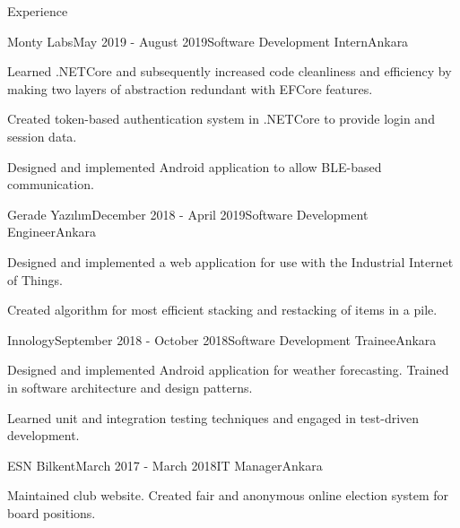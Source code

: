 \documentclass{resume} %
\begin{document}
\begin{rSection}{Experience}

    \begin{rSubsection}{Monty Labs}{May 2019 - August 2019}{Software Development Intern}{Ankara}
        \item Learned .NETCore and subsequently increased code cleanliness and efficiency by making two layers of abstraction redundant with EFCore features.
        
        \item Created token-based authentication system in .NETCore to provide login and session data.
        
        \item Designed and implemented Android application to allow BLE-based communication.
    \end{rSubsection}
    
    \begin{rSubsection}{Gerade Yazılım}{December 2018 - April 2019}{Software Development Engineer}{Ankara}
        \item Designed and implemented a web application for use with the Industrial Internet of Things.
        \item Created algorithm for most efficient stacking and restacking of items in a pile.
    \end{rSubsection}
    
    \begin{rSubsection}{Innology}{September 2018 - October 2018}{Software Development Trainee}{Ankara}
        \item Designed and implemented Android application for weather forecasting. Trained in software architecture and design patterns.
    
        \item Learned unit and integration testing techniques and engaged in test-driven development.
    \end{rSubsection}
    
    \begin{rSubsection}{ESN Bilkent}{March 2017 - March 2018}{IT Manager}{Ankara}
        \item Maintained club website. Created fair and anonymous online election system for board positions.
    \end{rSubsection}
    
\end{rSection}

\end{document}
